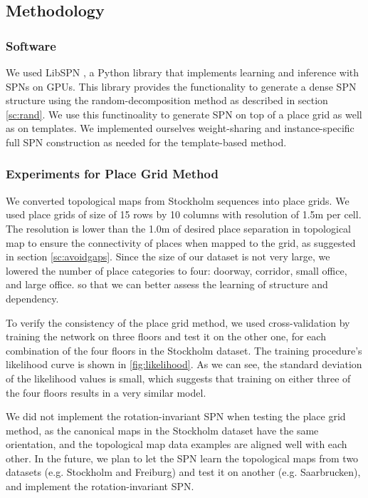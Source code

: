 \documentclass[10pt, titlepage]{article}
\theoremstyle{definition}
\begin{document}
\subsection{Methodology}\label{section:method}
\subsubsection{Software}
We used LibSPN \cite{pronobis2016learning}, a Python library that implements learning and inference with SPNs on GPUs. This library provides the functionality to generate a dense SPN structure using the random-decomposition method as described in section \ref{sc:rand}. We use this functinoality to generate SPN on top of a place grid as well as on templates. We implemented ourselves weight-sharing and instance-specific full SPN construction as needed for the template-based method. 

\subsubsection{Experiments for Place Grid Method}\label{section:exp-grid}

We converted topological maps from Stockholm sequences into place grids. We used place grids of size of 15 rows by 10 columns with resolution of 1.5m per cell. The resolution is lower than the 1.0m of desired place separation in topological map to ensure the connectivity of places when mapped to the grid, as suggested in section \ref{sc:avoidgaps}. Since the size of our dataset is not very large, we lowered the number of place categories to four: doorway, corridor, small office, and large office. so that we can better assess the learning of structure and dependency.


To verify the consistency of the place grid method,  we used cross-validation by training the network on three floors and test it on the other one, for each combination of the four floors in the Stockholm dataset. The training procedure's likelihood curve is shown in \ref{fig:likelihood}. As we can see, the standard deviation of the likelihood values is small, which suggests that training on either three of the four floors results in a very similar model.

We did not implement the rotation-invariant SPN when testing the place grid method, as the canonical maps in the Stockholm dataset have the same orientation, and the topological map data examples are aligned well with each other. In the future, we plan to let the SPN learn the topological maps from two datasets (e.g. Stockholm and Freiburg) and test it on another (e.g. Saarbrucken), and implement the rotation-invariant SPN.
\end{document}
